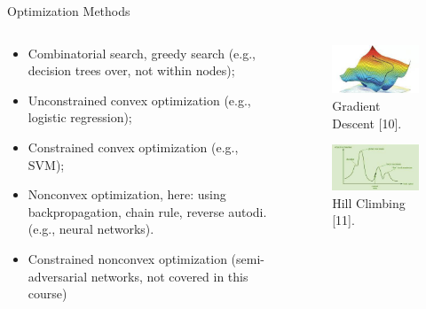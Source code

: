 \documentclass[compress,oilve]{beamer}
\begin{document}
\begin{frame}{Optimization Methods}
\begin{columns}
\begin{column}{0.5\textwidth}
\begin{itemize}
\item Combinatorial search, greedy search (e.g., decision trees over, not within nodes);
\item Unconstrained convex optimization (e.g., logistic regression);
\item Constrained convex optimization (e.g., SVM);
\item Nonconvex optimization, here: using backpropagation, chain rule, reverse autodi. (e.g., neural networks).
\item Constrained nonconvex optimization (semi-adversarial networks, not covered in this course)
\end{itemize}
\end{column}
\begin{column}{0.5\textwidth}
\begin{figure}
\centering
\includegraphics[scale=0.35]{17}  
 \caption{Gradient Descent [10].}
\end{figure}
\begin{figure}
\centering
\includegraphics[scale=0.35]{26}  
 \caption{Hill Climbing [11].}
\end{figure}
\end{column}
\end{columns}
\end{frame}
\end{document}
